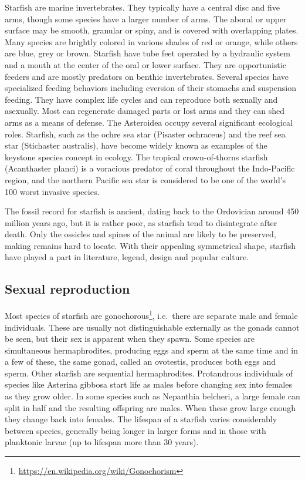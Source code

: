 \documentclass[]{book}
\let\rmarkdownfootnote\footnote%
\def\footnote{\protect\rmarkdownfootnote}
\renewcommand{\href}[2]{#2\footnote{\url{#1}}}
\theoremstyle{definition}
\theoremstyle{definition}
\theoremstyle{definition}
\theoremstyle{remark}
\begin{document}
Starfish are marine invertebrates. They typically have a central disc
and five arms, though some species have a larger number of arms. The
aboral or upper surface may be smooth, granular or spiny, and is covered
with overlapping plates. Many species are brightly colored in various
shades of red or orange, while others are blue, grey or brown. Starfish
have tube feet operated by a hydraulic system and a mouth at the center
of the oral or lower surface. They are opportunistic feeders and are
mostly predators on benthic invertebrates. Several species have
specialized feeding behaviors including eversion of their stomachs and
suspension feeding. They have complex life cycles and can reproduce both
sexually and asexually. Most can regenerate damaged parts or lost arms
and they can shed arms as a means of defense. The Asteroidea occupy
several significant ecological roles. Starfish, such as the ochre sea
star (Pisaster ochraceus) and the reef sea star (Stichaster australis),
have become widely known as examples of the keystone species concept in
ecology. The tropical crown-of-thorns starfish (Acanthaster planci) is a
voracious predator of coral throughout the Indo-Pacific region, and the
northern Pacific sea star is considered to be one of the world's 100
worst invasive species.

The fossil record for starfish is ancient, dating back to the Ordovician
around 450 million years ago, but it is rather poor, as starfish tend to
disintegrate after death. Only the ossicles and spines of the animal are
likely to be preserved, making remains hard to locate. With their
appealing symmetrical shape, starfish have played a part in literature,
legend, design and popular culture.

\subsection{Sexual reproduction}\label{sexual-reproduction-1}

Most species of starfish are
\href{https://en.wikipedia.org/wiki/Gonochorism}{gonochorous},
i.e.~there are separate male and female individuals. These are usually
not distinguishable externally as the gonads cannot be seen, but their
sex is apparent when they spawn. Some species are simultaneous
hermaphrodites, producing eggs and sperm at the same time and in a few
of these, the same gonad, called an ovotestis, produces both eggs and
sperm. Other starfish are sequential hermaphrodites. Protandrous
individuals of species like Asterina gibbosa start life as males before
changing sex into females as they grow older. In some species such as
Nepanthia belcheri, a large female can split in half and the resulting
offspring are males. When these grow large enough they change back into
females. The lifespan of a starfish varies considerably between species,
generally being longer in larger forms and in those with planktonic
larvae (up to lifespan more than 30 years).
\end{document}
